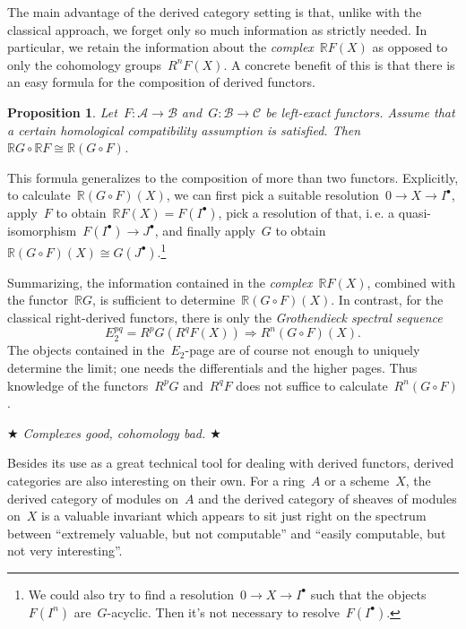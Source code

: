 \documentclass{amsart}
\makeatletter
\theoremstyle{definition}
\theoremstyle{plain}
\newtheorem{prop}[defn]{Proposition}
\theoremstyle{remark}
\newcommand{\A}{\mathcal{A}}
\newcommand{\B}{\mathcal{B}}
\newcommand{\C}{\mathcal{C}}
\newcommand{\RR}{\mathbb{R}}
\newcommand{\?}{\,{:}\,}
\renewcommand{\_}{\mathpunct{.}\,}
\newcommand{\ie}{i.\,e.\@\xspace}
\makeatother
\begin{document}
The main advantage of the derived category setting is that, unlike with the
classical approach, we forget only so much information as strictly needed.
In particular, we retain the information about the \emph{complex}~$\RR F(X)$ as
opposed to only the cohomology groups~$R^n F(X)$. A concrete benefit of this is
that there is an easy formula for the composition of derived functors.

\begin{prop}Let~$F : \A \to \B$ and~$G : \B \to \C$ be left-exact functors.
Assume that a certain homological compatibility assumption is satisfied.
Then~$\RR G \circ \RR F \cong \RR (G \circ F)$.\end{prop}

This formula generalizes to the composition of more than two functors.
Explicitly, to calculate~$\RR (G \circ F)(X)$, we can first pick a suitable
resolution~$0 \to X \to I^\bullet$, apply~$F$ to obtain~$\RR F(X) =
F(I^\bullet)$, pick a resolution of that, \ie a quasi-isomorphism~$F(I^\bullet)
\to J^\bullet$, and finally apply~$G$ to obtain~$\RR (G \circ F)(X) \cong
G(J^\bullet)$.\footnote{We could also try to find a resolution~$0 \to X \to
I^\bullet$ such that the objects~$F(I^n)$ are~$G$-acyclic. Then it's not
necessary to resolve~$F(I^\bullet)$.}

Summarizing, the information contained in the \emph{complex}~$\RR F(X)$, combined with the functor~$\RR G$, is
sufficient to determine~$\RR (G \circ F)(X)$. In contrast, for the classical
right-derived functors, there is only the \emph{Grothendieck spectral sequence}
\[ E_2^{pq} = R^p G(R^q F(X)) \Longrightarrow R^n (G \circ F)(X). \]
The objects contained in the~$E_2$-page are of course not enough to uniquely
determine the limit; one needs the differentials and the higher pages. Thus
knowledge of the functors~$R^p G$ and~$R^q F$ does not suffice to
calculate~$R^n(G \circ F)$.

\begin{center}\emph{$\bigstar$ Complexes good, cohomology bad. $\bigstar$}\end{center}

Besides its use as a great technical tool for dealing with derived functors,
derived categories are also interesting on their own. For a ring~$A$ or a
scheme~$X$, the derived category of modules on~$A$ and the derived category of
sheaves of modules on~$X$ is a valuable invariant which appears to sit just
right on the spectrum between ``extremely valuable, but not computable'' and
``easily computable, but not very interesting''.
\end{document}
